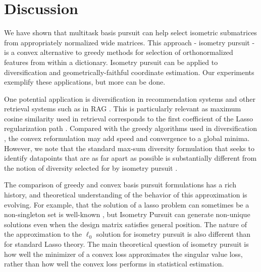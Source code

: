 \section{Discussion}
\label{sec:discussion}

We have shown that multitask basis pursuit can help select isometric submatrices from appropriately normalized wide matrices.
This approach - isometry pursuit - is a convex alternative to greedy methods for selection of orthonormalized features from within a dictionary.
Isometry pursuit can be applied to diversification and geometrically-faithful coordinate estimation.
Our experiments exemplify these applications, but more can be done.

One potential application is diversification in recommendation systems \citep{Carbonell2017-gi, Wu2019-uk, Langchain} and other retrieval systems such as in RAG \citep{Gao2023-cn, Pickett2024-ad, In2024-um, Weiss2024-xm, Vectara}.
This is particularly relevant as maximum cosine similarity used in retrieval corresponds to the first coefficient of the Lasso regularization path \citep{Koelle2022-ju}.
Compared with the greedy algorithms used in diversification \citep{Carbonell1998-ji, Barioni, Drosou, Qin2012-ok, KUNAVER2017154, Guo-shengbo, Abdool,Yu2016AGA,  Huang2024-wr, Pickett2024-ad, 5895106, Zhu2020-vb}, the convex reformulation may add speed and convergence to a global minima.
However, we note that the standard max-sum diversity formulation that seeks to identify datapoints that are as far apart as possible is substantially different from the notion of diversity selected for by isometry pursuit \citep{Kuo1993-zy, Ghosh1996-id, Alfonso-Cevallos-Friedrich-Eisenbrand-and-Rico-Zenklusen2016-ai, Ashkan2015-jv}.

The comparison of greedy \citep{Mallat93-wi, Mallat, Pati-93, Tropp05-ml} and convex \citep{Chen2001-hh, Tropp06-sg,Chen2006TheoreticalRO} basis pursuit formulations has a rich history, and theoretical understanding of the behavior of this approximation is evolving.
For example, that the solution of a lasso problem can sometimes be a non-singleton set is well-known \citep{Osborne2000OnTL, DOSSAL2012117, Chrtien2011OnTG, Tibshirani2012TheLP, Ewald2017OnTD, Ali2018TheGL, Schneider2020-qt, Mishkin2022TheSP,Dupuis2019TheGO,Debarre2020OnTU,Everink2024TheGA}, but Isometry Pursuit can generate non-unique solutions even when the design matrix satisfies general position.
The nature of the approximation to the $\ell_0$ solution for isometry pursuit is also different than for standard Lasso theory.
The main theoretical question of isometry pursuit is how well the minimizer of a convex loss approximates the singular value loss, rather than how well the convex loss performs in statistical estimation.


